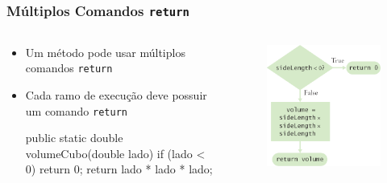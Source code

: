 \documentclass[xcolor={dvipsnames,table},aspectratio=169]{beamer}
\begin{document}
\begin{frame}[fragile]\frametitle{Múltiplos Comandos \texttt{return}}
\begin{columns}[T]
	\begin{column}{0.7\linewidth}
\begin{itemize}
	\item Um método pode usar múltiplos comandos \texttt{return}
	\item Cada ramo de execução deve possuir um comando \texttt{return}
{\scriptsize
\begin{javacode}
public static double volumeCubo(double lado) {
  if (lado < 0) { 
    return 0; 
  }
  return lado * lado * lado;
}
\end{javacode}
}
\end{itemize}
	\end{column}
	\begin{column}{0.3\linewidth}
\begin{figure}[h]
	\includegraphics[height=0.5\paperheight,center]{pucrs-ep-fprog-unidade_05-metodos-laminas-fluxograma_return.png}
\end{figure}
	\end{column}
\end{columns}
\end{frame}
\end{document}
